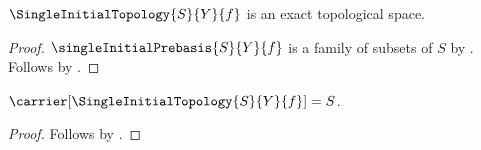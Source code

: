 \begin{theorem}\label{single_initial_topology_is_exact}
    $\SingleInitialTopology{S}{Y}{f}$ is an exact topological space.
\end{theorem}
\begin{proof}
    $\singleInitialPrebasis{S}{Y}{f}$ is a family of subsets of $S$ by
        .
    Follows by
        .
\end{proof}

\begin{proposition}\label{single_initial_topology_carrier}
    $\carrier[\SingleInitialTopology{S}{Y}{f}]=S$.
\end{proposition}
\begin{proof}
    Follows by
        .
\end{proof}

